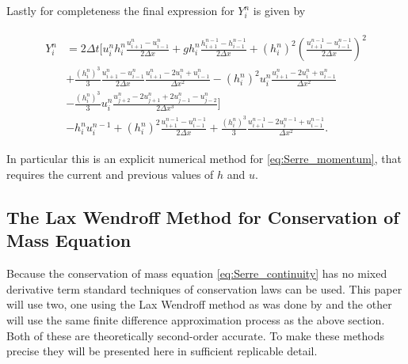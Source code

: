 \documentclass[SingleSpace,12pt,Proceedings]{Serre_ASCE}
\begin{document}
Lastly for completeness the final expression for $Y^n_i$ is given by
\begin{linenomath*}
\begin{gather}
\begin{split}
Y^n_i &= 2\Delta t \Bigg[u^n_ih^n_i \frac{u^{n}_{i+1} - u^{n}_{i-1}}{2\Delta x} + gh^n_i\frac{h^{n-1}_{i+1} - h^{n-1}_{i-1}}{2\Delta x} + \left(h^n_i\right)^2 \left(\frac{u^{n-1}_{i+1} - u^{n-1}_{i-1}}{2\Delta x} \right)^2 \\ &+ \frac{\left(h^n_i\right)^3}{3}\frac{u^{n}_{i+1} - u^{n}_{i-1}}{2\Delta x}\frac{u^{n}_{i+1} -2u^{n}_{i}   + u^{n}_{i-1}}{\Delta x^2} - \left(h^n_i\right)^2u^n_i\frac{u^{n}_{i+1} -2u^{n}_{i} + u^{n}_{i-1}}{\Delta x^2}  \\  &- \frac{\left(h^n_i\right)^3}{3}u^n_i\frac{ u^n_{j+2} - 2u^n_{j+1} + 2 u^n_{j-1} - u^n_{j-2}}{2 \Delta x^3} \Bigg] \\ &- h_i^{n}u_i^{n-1} + \left(h_i^{n}\right)^2\frac{u^{n-1}_{i+1} - u^{n-1}_{i-1}}{2\Delta x} + \frac{\left(h_i^{n}\right)^3}{3}\frac{u^{n-1}_{i+1} -2 u^{n-1}_{i} + u^{n-1}_{i-1}}{\Delta x^2}.
\end{split}
\end{gather}
\end{linenomath*}
In particular this is an explicit numerical method for \eqref{eq:Serre_momentum}, that requires the current and previous values of $h$ and $u$.


\subsection{The Lax Wendroff Method for Conservation of Mass Equation}
\label{section:}
Because the conservation of mass equation \eqref{eq:Serre_continuity} has no mixed derivative term standard techniques of conservation laws can be used. This paper will use two, one using the Lax Wendroff method as was done by  and the other will use the same finite difference approximation process as the above section. Both of these are theoretically second-order accurate. To make these methods precise they will be presented here in sufficient replicable detail.
\end{document}
